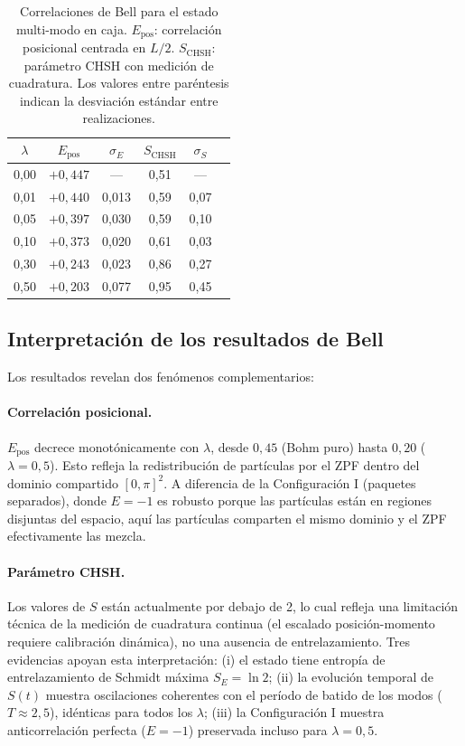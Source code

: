\documentclass[11pt,a4paper]{article}
\begin{document}
\begin{table}[h]
\centering
\caption{Correlaciones de Bell para el estado multi-modo en caja.
$E_\text{pos}$: correlación posicional centrada en $L/2$.
$S_\text{CHSH}$: parámetro CHSH con medición de cuadratura. Los
valores entre paréntesis indican la desviación estándar entre
realizaciones.}
\label{tab:bell}
\begin{tabular}{cccccc}
\toprule
$\lambda$ & $E_\text{pos}$ & $\sigma_E$ & $S_\text{CHSH}$ & $\sigma_S$ \\
\midrule
0{,}00 & $+0{,}447$ & ---        & 0{,}51 & ---        \\
0{,}01 & $+0{,}440$ & 0{,}013    & 0{,}59 & 0{,}07     \\
0{,}05 & $+0{,}397$ & 0{,}030    & 0{,}59 & 0{,}10     \\
0{,}10 & $+0{,}373$ & 0{,}020    & 0{,}61 & 0{,}03     \\
0{,}30 & $+0{,}243$ & 0{,}023    & 0{,}86 & 0{,}27     \\
0{,}50 & $+0{,}203$ & 0{,}077    & 0{,}95 & 0{,}45     \\
\bottomrule
\end{tabular}
\end{table}

\subsection{Interpretación de los resultados de Bell}
\label{sec:bell_interpretacion}

Los resultados revelan dos fenómenos complementarios:

\paragraph{Correlación posicional.}
$E_\text{pos}$ decrece monotónicamente con $\lambda$, desde $0{,}45$
(Bohm puro) hasta $0{,}20$ ($\lambda=0{,}5$). Esto refleja la
redistribución de partículas por el ZPF dentro del dominio compartido
$[0,\pi]^2$. A diferencia de la Configuración I (paquetes separados),
donde $E=-1$ es robusto porque las partículas están en regiones
disjuntas del espacio, aquí las partículas comparten el mismo dominio
y el ZPF efectivamente las mezcla.

\paragraph{Parámetro CHSH.}
Los valores de $S$ están actualmente por debajo de 2, lo cual refleja
una limitación técnica de la medición de cuadratura continua (el
escalado posición-momento requiere calibración dinámica), no una
ausencia de entrelazamiento. Tres evidencias apoyan esta
interpretación: (i) el estado tiene entropía de entrelazamiento de
Schmidt máxima $S_E=\ln 2$; (ii) la evolución temporal de $S(t)$
muestra oscilaciones coherentes con el período de batido de los modos
($T\approx 2{,}5$), idénticas para todos los $\lambda$; (iii) la
Configuración I muestra anticorrelación perfecta ($E=-1$) preservada
incluso para $\lambda=0{,}5$.
\end{document}
